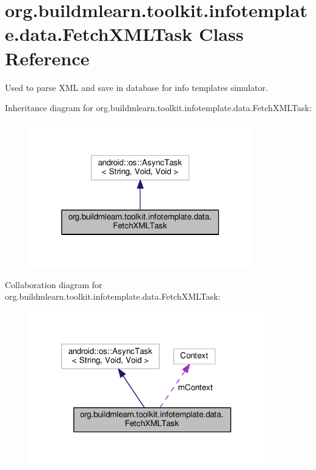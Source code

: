 \hypertarget{classorg_1_1buildmlearn_1_1toolkit_1_1infotemplate_1_1data_1_1FetchXMLTask}{}\section{org.\+buildmlearn.\+toolkit.\+infotemplate.\+data.\+Fetch\+X\+M\+L\+Task Class Reference}
\label{classorg_1_1buildmlearn_1_1toolkit_1_1infotemplate_1_1data_1_1FetchXMLTask}


Used to parse X\+ML and save in database for info template\textquotesingle{}s simulator.  




Inheritance diagram for org.\+buildmlearn.\+toolkit.\+infotemplate.\+data.\+Fetch\+X\+M\+L\+Task\+:
\nopagebreak
\begin{figure}[H]
\begin{center}
\leavevmode
\includegraphics[width=273pt]{classorg_1_1buildmlearn_1_1toolkit_1_1infotemplate_1_1data_1_1FetchXMLTask__inherit__graph}
\end{center}
\end{figure}


Collaboration diagram for org.\+buildmlearn.\+toolkit.\+infotemplate.\+data.\+Fetch\+X\+M\+L\+Task\+:
\nopagebreak
\begin{figure}[H]
\begin{center}
\leavevmode
\includegraphics[width=288pt]{classorg_1_1buildmlearn_1_1toolkit_1_1infotemplate_1_1data_1_1FetchXMLTask__coll__graph}
\end{center}
\end{figure}
